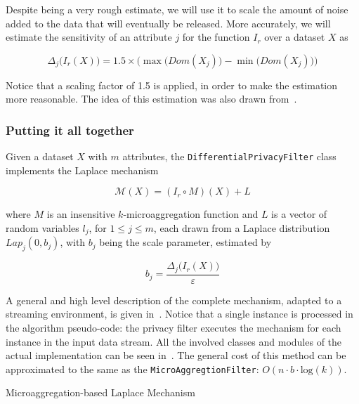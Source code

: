 Despite being a very rough estimate, we will use it to scale the amount of noise added to the data that will eventually be released. More accurately, we will estimate the sensitivity of an attribute $j$ for the function $I_r$ over a dataset $X$ as

\begin{equation}
\Delta_j\big(I_r(X)\big) = 1.5 \times \Big(\max\big(Dom(X_j)) - \min\big(Dom(X_j))\Big)
\end{equation}

Notice that a scaling factor of 1.5 is applied, in order to make the estimation more reasonable. The idea of this estimation was also drawn from~\citet{Domingo:EnhancingDiffPrivMicroaggregation}.

\subsubsection{Putting it all together}
\label{Implementation:DifferentialPrivacy:Design:AllTogether}

Given a dataset $X$ with $m$ attributes, the \texttt{DifferentialPrivacyFilter} class implements the Laplace mechanism 

\begin{equation*}
\mathcal{M}(X) = (I_r \circ M)(X) + L
\end{equation*}

where $M$ is an insensitive $k$-microaggregation function and $L$ is a vector of random variables $l_j$, for $1 \leq j \leq m$, each drawn from a Laplace distribution $Lap_j(0,b_j)$, with $b_j$ being the scale parameter, estimated by

\begin{equation*}
b_j = \frac{\Delta_j\big(I_r(X)\big)}{\varepsilon}
\end{equation*}

A general and high level description of the complete mechanism, adapted to a streaming environment, is given in~. Notice that a single instance is processed in the algorithm pseudo-code: the privacy filter executes the mechanism for each instance in the input data stream. All the involved classes and modules of the actual implementation can be seen in~. The general cost of this method can be approximated to the same as the \texttt{MicroAggregtionFilter}: $O(n \cdot b \cdot \mathrm{log}(k))$.

\begin{algorithm}[h]
\caption{Microaggregation-based Laplace Mechanism\label{al:laplace-mechanism}}
\end{algorithm}

